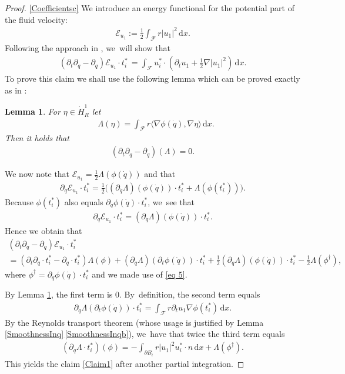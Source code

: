 \documentclass[10pt]{amsart}
\newtheorem{lemma}[theorem]{Lemma}
\theoremstyle{definition}
\newcommand\scalar[2]{\langle #1,#2\rangle}
\newcommand\eq{=}
\newcommand\dd{\,\mathrm{d}}
\newcommand\dx{\dd x}
\let\de\partial
\begin{document}
\begin{proof}
\eqref{Coefficientsc}
We introduce an energy functional for the potential part of the fluid velocity:
\begin{align*}
\mathcal{E}_{u_1}:=\frac{1}{2}\int_{\mathcal{F}} r|u_1|^2\dx.
\end{align*}
Following the approach in \cite{Munnier5}, we~will show that
\begin{align}\label{Claim1}
(\de_t\de_{\dot{q}}-\de_{q})\mathcal{E}_{u_1}\cdot t_i^*\,=\int_{\mathcal{F}}u_i^*\cdot(\de_tu_1+\frac{1}{2}\nabla|u_1|^2)\dx.
\end{align}
To prove this claim we shall use the following lemma which can be proved exactly as in \cite[Lem.\,5.1]{Munnier5}: \begin{lemma}\label{deriForm}
For $\eta\in \dot{H}_R^1$ let
\begin{align*}&\Lambda(\eta)\eq\int_{\mathcal{F}}r\scalar{\nabla\phi(\dot{q})}{\nabla \eta} \dx.
\end{align*}
Then it holds that
\begin{align*}
(\de_t\de_{\dot{q}}-\de_q)(\Lambda)\eq0.
\end{align*}\end{lemma}
We now note that
$\mathcal{E}_{u_1}\eq\frac{1}{2}\Lambda(\phi(\dot{q}))$ and that
\begin{align*}
\de_{\dot{q}}\mathcal{E}_{u_1}\cdot t_i^*\eq\frac{1}{2}\bigl((\de_{\dot{q}}\Lambda)(\phi(\dot{q}))\cdot t_i^*+\Lambda(\phi(t_i^*))\bigr).
\end{align*}
Because $\phi(t_i^*)$ also equals $\de_{\dot{q}}\phi(\dot{q})\cdot t_i^*$, we~see that
\begin{align}\label{eq 5}
\de_{\dot{q}}\mathcal{E}_{u_1}\cdot t_i^*\eq(\de_{\dot{q}}\Lambda)(\phi(\dot{q}))\cdot t_i^*.
\end{align}
Hence we obtain that
\begin{multline*}
(\de_t\de_{\dot{q}}-\de_{q})\mathcal{E}_{u_1}\cdot t_i^*\\
\eq\left(\de_t\de_{\dot{q}}\cdot t_i^*-\de_q\cdot t_i^*\right)\Lambda(\phi)
+(\de_{\dot{q}}\Lambda)(\de_t\phi(\dot{q}))\cdot t_i^*
+\frac{1}{2}(\de_q\Lambda)(\phi(\dot{q}))\cdot t_i^*
-\frac{1}{2}\Lambda(\phi^\dagger),
\end{multline*}
where $\phi^\dagger=\de_q\phi(\dot{q})\cdot t_i^*$ and we made use of \eqref{eq 5}.

By Lemma \ref{deriForm}, the first term is $0$. By~definition, the second term equals
\begin{align*}
\de_{\dot{q}}\Lambda(\de_t\phi(\dot{q}))\cdot t_i^*\eq\int_{\mathcal{F}}r\de_tu_1\nabla \phi(t_i^*)\dx.
\end{align*}
By the Reynolds transport theorem (whose usage is justified by Lemma \ref{SmoothnessInq}\,\eqref{SmoothnessInqb}), we~have that twice the third term equals
\begin{align*}
(\de_q\Lambda\cdot t_i^*)(\phi)\eq-\int_{\de B_i}r|u_1|^2u_i^*\cdot n\dx+\Lambda(\phi^\dagger).
\end{align*}
This yields the claim \eqref{Claim1} after another partial integration.


\end{proof}
\end{document}
